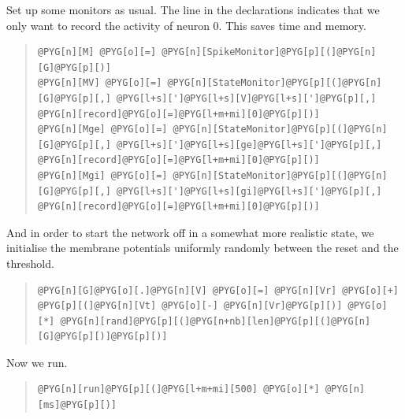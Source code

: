 \documentclass[letterpaper,10pt,english]{manual}
\begin{document}
Set up some monitors as usual. The line  in the \hyperlink{brian.StateMonitor}{}
declarations indicates that we only want to record the activity of
neuron 0. This saves time and memory.
\begin{quote}

\begin{Verbatim}[commandchars=@\[\]]
@PYG[n][M] @PYG[o][=] @PYG[n][SpikeMonitor]@PYG[p][(]@PYG[n][G]@PYG[p][)]
@PYG[n][MV] @PYG[o][=] @PYG[n][StateMonitor]@PYG[p][(]@PYG[n][G]@PYG[p][,] @PYG[l+s][']@PYG[l+s][V]@PYG[l+s][']@PYG[p][,] @PYG[n][record]@PYG[o][=]@PYG[l+m+mi][0]@PYG[p][)]
@PYG[n][Mge] @PYG[o][=] @PYG[n][StateMonitor]@PYG[p][(]@PYG[n][G]@PYG[p][,] @PYG[l+s][']@PYG[l+s][ge]@PYG[l+s][']@PYG[p][,] @PYG[n][record]@PYG[o][=]@PYG[l+m+mi][0]@PYG[p][)]
@PYG[n][Mgi] @PYG[o][=] @PYG[n][StateMonitor]@PYG[p][(]@PYG[n][G]@PYG[p][,] @PYG[l+s][']@PYG[l+s][gi]@PYG[l+s][']@PYG[p][,] @PYG[n][record]@PYG[o][=]@PYG[l+m+mi][0]@PYG[p][)]
\end{Verbatim}
\end{quote}

And in order to start the network off in a somewhat
more realistic state, we initialise the membrane
potentials uniformly randomly between the reset and
the threshold.
\begin{quote}

\begin{Verbatim}[commandchars=@\[\]]
@PYG[n][G]@PYG[o][.]@PYG[n][V] @PYG[o][=] @PYG[n][Vr] @PYG[o][+] @PYG[p][(]@PYG[n][Vt] @PYG[o][-] @PYG[n][Vr]@PYG[p][)] @PYG[o][*] @PYG[n][rand]@PYG[p][(]@PYG[n+nb][len]@PYG[p][(]@PYG[n][G]@PYG[p][)]@PYG[p][)]
\end{Verbatim}
\end{quote}

Now we run.
\begin{quote}

\begin{Verbatim}[commandchars=@\[\]]
@PYG[n][run]@PYG[p][(]@PYG[l+m+mi][500] @PYG[o][*] @PYG[n][ms]@PYG[p][)]
\end{Verbatim}
\end{quote}
\end{document}
